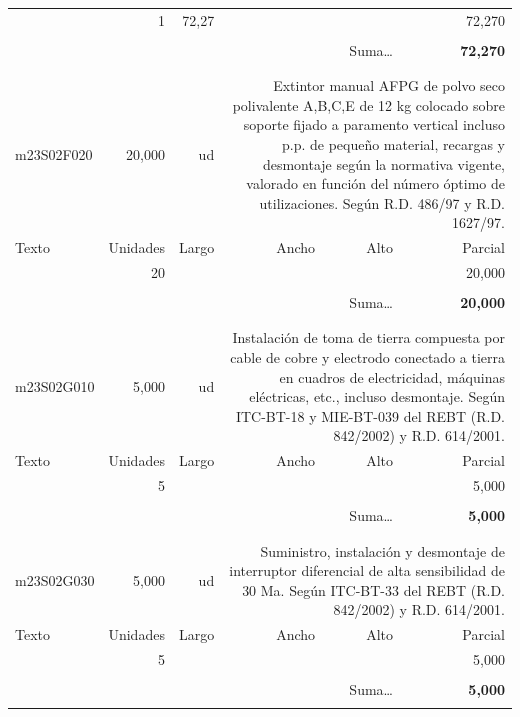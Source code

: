 \documentclass{book}%
\begin{document}
\begin{longtable}{lrrrrr}
\hline%
\multicolumn{1}{p{3.5cm}}{ }&1&72,27&&&    72,270\\%
&&&&&\\%
\multicolumn{5}{r}{Suma\ldots}&\textbf{    72,270}\\%
\hline%
&&&&&\\%
&&&&&\\%
m23S02F020&    20,000& ud&\multicolumn{3}{p{6cm}}{\scriptsize Extintor manual AFPG de polvo seco polivalente A,B,C,E de 12 kg colocado sobre soporte fijado a paramento vertical incluso p.p. de pequeño material, recargas y desmontaje según la normativa vigente, valorado en función del número óptimo de utilizaciones. Según R.D. 486/97 y R.D. 1627/97.\normalsize}\\%
Texto&Unidades&Largo&Ancho&Alto&Parcial\\%
\hline%
\multicolumn{1}{p{3.5cm}}{ }&20&&&&    20,000\\%
&&&&&\\%
\multicolumn{5}{r}{Suma\ldots}&\textbf{    20,000}\\%
\hline%
&&&&&\\%
&&&&&\\%
m23S02G010&     5,000& ud&\multicolumn{3}{p{6cm}}{\scriptsize Instalación de toma de tierra compuesta por cable de cobre y electrodo conectado a tierra en cuadros de electricidad, máquinas eléctricas, etc., incluso desmontaje. Según ITC-BT-18 y MIE-BT-039 del REBT (R.D. 842/2002) y R.D. 614/2001.\normalsize}\\%
Texto&Unidades&Largo&Ancho&Alto&Parcial\\%
\hline%
\multicolumn{1}{p{3.5cm}}{ }&5&&&&     5,000\\%
&&&&&\\%
\multicolumn{5}{r}{Suma\ldots}&\textbf{     5,000}\\%
\hline%
&&&&&\\%
&&&&&\\%
m23S02G030&     5,000& ud&\multicolumn{3}{p{6cm}}{\scriptsize Suministro, instalación y desmontaje de interruptor diferencial de alta sensibilidad de 30 Ma. Según ITC-BT-33 del REBT (R.D. 842/2002) y R.D. 614/2001.\normalsize}\\%
Texto&Unidades&Largo&Ancho&Alto&Parcial\\%
\hline%
\multicolumn{1}{p{3.5cm}}{ }&5&&&&     5,000\\%
&&&&&\\%
\multicolumn{5}{r}{Suma\ldots}&\textbf{     5,000}\\%
\hline%
&&&&&\\%

\end{longtable}
\end{document}
